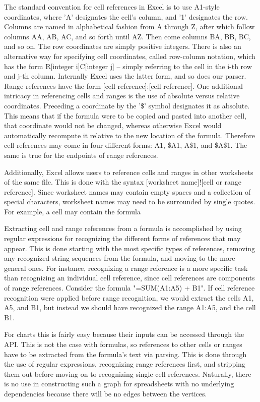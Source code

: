 The standard convention for cell references in Excel is to use A1-style 
coordinates, where 'A' designates the cell's column, and '1' designates 
the row.  Columns are named in alphabetical fashion from A through Z, 
after which follow columns AA, AB, AC, and so forth until AZ. Then come 
columns BA, BB, BC, and so on.  The row coordinates are simply positive 
integers.  There is also an alternative way for specifying cell 
coordinates, called row-column notation, which has the form 
R[integer i]C[integer j] -- simply referring to the cell in the i-th row 
and j-th column.  Internally Excel uses the latter form, and so does our 
parser.  Range references have the form [cell reference]:[cell reference].
One additional intricacy in referencing cells and ranges is the use of 
absolute versus relative coordinates.  Preceding a coordinate by the 
'\$' symbol designates it as absolute.  This means that if the formula 
were to be copied and pasted into another cell, that coordinate would not
be changed, whereas otherwise Excel would automatically recompute it
relative to the new location of the formula.  Therefore cell references
may come in four different forms: A1, \$A1, A\$1, and \$A\$1.  The same is 
true for the endpoints of range references.  

Additionally, Excel allows users to reference cells and ranges in other 
worksheets of the same file. This is done with the syntax 
[worksheet name]![cell or range reference]. Since worksheet names may contain
empty spaces and a collection of special characters, worksheet names may 
need to be surrounded by single quotes.  For example, a cell may contain the 
formula %

Extracting cell and range references from a formula is accomplished by 
using regular expressions for recognizing the different forms of references
that may appear.  This is done starting with the most specific types of 
references, removing any recognized string sequences from the formula, 
and moving to the more general ones.  For instance, recognizing a range 
reference is a more specific task than recognizing an individual cell
reference, since cell references are components of range references.  Consider
the formula "=SUM(A1:A5) + B1". If cell reference recognition were applied 
before range recognition, we would extract the cells A1, A5, and B1, but instead
we should have recognized the range A1:A5, and the cell B1. 

For charts this is fairly easy because their
inputs can be accessed through the API.  This is not the case with
formulas, so references to other cells or ranges have to be extracted
from the formula's text via parsing.  This is done through the use
of regular expressions, recognizing range references first, and
stripping them out before moving on to recognizing single cell
references.  Naturally, there is no use in constructing such a graph
for spreadsheets with no underlying dependencies because there will be
no edges between the vertices.

